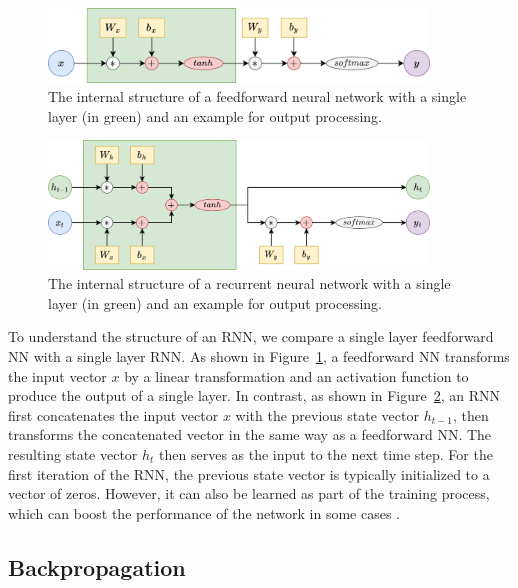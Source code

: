 \documentclass{article}
\newcommand{\reffig}[1]{Figure~\ref{#1}}
\begin{document}
\begin{figure}[htbp]
  \centering
  \includegraphics[width=0.9\textwidth]{Block Diagram Feedforward.drawio.png}
  \caption{The internal structure of a feedforward neural network with a single layer (in
    green) and an example for output processing.}
  \label{fig:internal-feedforward}
\end{figure}

\begin{figure}[htbp]
  \centering
  \includegraphics[width=0.9\textwidth]{Block Diagram RNN.drawio.png}
  \caption{The internal structure of a recurrent neural network with a single layer (in
    green) and an example for output processing.}
  \label{fig:internal-rnn}
\end{figure}

To understand the structure of an RNN, we compare a single layer feedforward NN with a
single layer RNN. As shown in \reffig{fig:internal-feedforward}, a feedforward NN
transforms the input vector $x$ by a linear transformation and an activation function to
produce the output of a single layer. In contrast, as shown in \reffig{fig:internal-rnn},
an RNN first concatenates the input vector $x$ with the previous state vector $h_{t-1}$,
then transforms the concatenated vector in the same way as a feedforward NN. The resulting
state vector $h_t$ then serves as the input to the next time step. For the first iteration
of the RNN, the previous state vector is typically initialized to a vector of zeros.
However, it can also be learned as part of the training process, which can boost the
performance of the network in some cases
\cite{sutskeverImportanceInitializationMomentum2013}.


\subsection{Backpropagation}
\label{sec:2.2}
\end{document}
